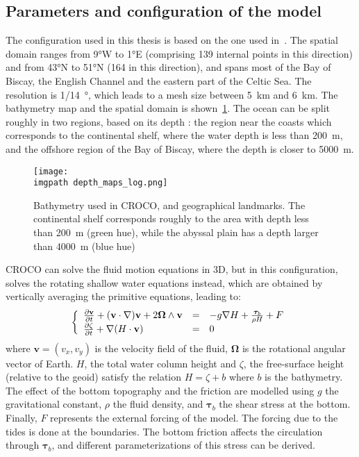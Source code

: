 \documentclass[../../Main_ManuscritThese.tex]{subfiles}
\newcommand{\CROCO}{CROCO}
\newcommand\imgpath{/home/victor/acadwriting/Manuscrit/Text/Chapter5/img/}
\begin{document}
\subsection{Parameters and configuration of the model}
\label{sec:geographical_setting}

The configuration used in this thesis is based on the one used
in~\cite{boutet_estimation_2015}. The spatial domain ranges from
\ang{9}W to \ang{1}E (comprising \num{139} internal points in this
direction) and from \ang{43}N to \ang{51}N (\num{164} in this
direction), and spans most of the Bay of Biscay, the English Channel
and the eastern part of the Celtic Sea.  The resolution is
\SI{1/14}{\degree}, which leads to a mesh size between
\SI{5}{\kilo\metre} and \SI{6}{\kilo\metre}. The bathymetry map and
the spatial domain is shown~\cref{fig:depth_maps}. The ocean can be
split roughly in two regions, based on its depth : the region near the
coasts which corresponds to the continental shelf, where the water
depth is less than \SI{200}{\meter}, and the offshore region of the
Bay of Biscay, where the depth is closer to \SI{5000}{\meter}.
\begin{figure}[ht]
  \centering \texttt{[image: \\imgpath depth\_maps\_log.png]}
  \caption[Bathymetry chart of the domain
  modelled]{\label{fig:depth_maps} Bathymetry used in \CROCO, and
    geographical landmarks. The continental shelf corresponds roughly
    to the area with depth less than \SI{200}{\meter} (green hue),
    while the abyssal plain has a depth larger than \SI{4000}{\meter}
    (blue hue)}
\end{figure}


\CROCO{} can solve the fluid motion equations in 3D, but in this
configuration, solves the rotating shallow water equations instead,
which are obtained by vertically averaging the primitive equations,
leading to:
\begin{align}
  \left\{
  \begin{array}{lll}
    \frac{\partial \mathbf{v}}{\partial t} + (\mathbf{v} \cdot \nabla )\mathbf{v} + 2 \bm{\Omega} \wedge \mathbf{v} & = & -g\nabla H + \frac{\bm{\tau}_b}{\rho H} + F \\
    \frac{\partial \zeta}{\partial t} + \nabla (H \cdot \mathbf{v})                                                     & = & 0
  \end{array}
                                                   \right.
\end{align}
where $\mathbf{v} = (v_x,v_y)$ is the velocity field of the fluid,
$\bm{\Omega}$ is the rotational angular vector of Earth. $H$, the
total water column height and $\zeta$, the free-surface height
(relative to the geoid) satisfy the relation $H = \zeta + b$ where $b$
is the bathymetry.  The effect of the bottom topography and the
friction are modelled using $g$ the gravitational constant, $\rho$ the
fluid density, and $\bm{\tau}_b$ the shear stress at the
bottom. Finally, $F$ represents the external forcing of the model.
The forcing due to the tides is done at the boundaries. The bottom
friction affects the circulation through $\bm{\tau}_b$, and different
parameterizations of this stress can be derived.
\end{document}
